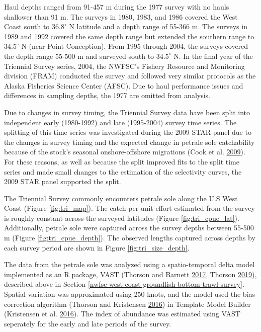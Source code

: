 \documentclass[12pt,]{article}
\begin{document}
Haul depths ranged from 91-457 m during the 1977 survey with no hauls
shallower than 91 m. The surveys in 1980, 1983, and 1986 covered the
West Coast south to \(36.8^\circ\) N latitude and a depth range of
55-366 m. The surveys in 1989 and 1992 covered the same depth range but
extended the southern range to \(34.5^\circ\) N (near Point Conception).
From 1995 through 2004, the surveys covered the depth range 55-500 m and
surveyed south to \(34.5^\circ\) N. In the final year of the Triennial
Survey series, 2004, the NWFSC's Fishery Resource and Monitoring
division (FRAM) conducted the survey and followed very similar protocols
as the Alaska Fisheries Science Center (AFSC). Due to haul performance
issues and differences in sampling depths, the 1977 are omitted from
analysis.

Due to changes in survey timing, the Triennial Survey data have been
split into independent early (1980-1992) and late (1995-2004) survey
time series. The splitting of this time series was investigated during
the 2009 STAR panel due to the changes in survey timing and the expected
change in petrale sole catchability because of the stock's seasonal
onshore-offshore migrations (Cook et al.
\protect\hyperlink{ref-cook_petrale_2009}{2009}). For these reasons, as
well as because the split improved fits to the split time series and
made small changes to the estimation of the selectivity curves, the 2009
STAR panel supported the split.

The Triennial Survey commonly encounters petrale sole along the U.S West
Coast (Figure \ref{fig:tri_map}). The catch-per-unit-effort estimated
from the survey is roughly constant across the surveyed latitudes
(Figure \ref{fig:tri_cpue_lat}). Additionally, petrale sole were
captured across the survey depths between 55-500 m (Figure
\ref{fig:tri_cpue_depth}). The observed lengths captured across depths
by each survey period are shown in Figure \ref{fig:tri_size_depth}.

The data from the petrale sole was analyzed using a spatio-temporal
delta model implemented as an R package, VAST (Thorson and Barnett
\protect\hyperlink{ref-thorson_comparing_2017}{2017}, Thorson
\protect\hyperlink{ref-thorson_guidance_2019}{2019}), described above in
Section \ref{nwfsc-west-coast-groundfish-bottom-trawl-survey}. Spatial
variation was approximated using 250 knots, and the model used the
bias-correction algorithm (Thorson and Kristensen
\protect\hyperlink{ref-thorson_implementing_2016}{2016}) in Template
Model Builder (Kristensen et al.
\protect\hyperlink{ref-kristensen_tmb:_2016}{2016}). The index of
abundance was estimated using VAST seperately for the early and late
periods of the survey.
\end{document}
